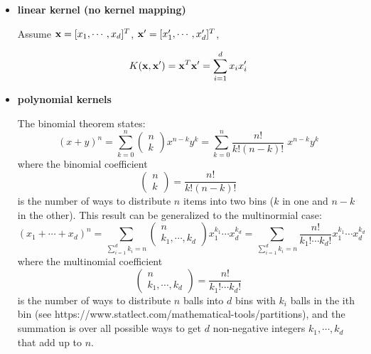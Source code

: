 \documentclass{article}
\begin{document}
\begin{itemize}
\item {\bf linear kernel (no kernel mapping)}

  Assume ${\bf x}=[x_1,\cdots,x_d]^T$, ${\bf x}'=[x'_1,\cdots,x'_d]^T$, 

  \begin{equation}	
    K({\bf x},{\bf x}')={\bf x}^T {\bf x}'=\sum_{i=1}^d x_ix'_i
  \end{equation}

\item {\bf polynomial kernels}

  The binomial theorem states:
  \begin{equation}
  (x+y)^n=\sum_{k=0}^n\left(\begin{array}{c}n\\k\end{array}\right) x^{n-k} y^k
  =\sum_{k=0}^n \frac{n!}{k!(n-k)!}\; x^{n-k} y^k
  \end{equation}
  where the binomial coefficient
  \begin{equation}
  \left(\begin{array}{c}n\\k\end{array}\right)=\frac{n!}{k!(n-k)!}
  \end{equation}
  is the number of ways to distribute $n$ items into two bins ($k$ in one
  and $n-k$ in the other). This result can be generalized to the multinormial
  case:  %
  \begin{equation}
  (x_1+\cdots+x_d)^n=\sum_{\sum_{i=1}^d k_i=n}
  \left(\begin{array}{c}n\\k_1,\cdots,k_d\end{array}\right)x_1^{k_1}\cdots x_d^{k_d}
  =\sum_{\sum_{i=1}^d k_i=n}\frac{n!}{k_1!\cdots k_d!}x_1^{k_1}\cdots x_d^{k_d}
  \end{equation}
  where the multinomial coefficient 
  \begin{equation}
    \left(\begin{array}{c}n\\k_1,\cdots,k_d\end{array}\right)
      =\frac{n!}{k_1!\cdots k_d!}
  \end{equation}
  is the number of ways to distribute $n$ balls into $d$ bins with 
  $k_i$ balls in the ith bin (see 
  {https://www.statlect.com/mathematical-tools/partitions}), and the 
  summation is over all possible ways to get $d$ non-negative integers 
  $k_1,\cdots,k_d$ that add up to $n$.


\end{itemize}
\end{document}
